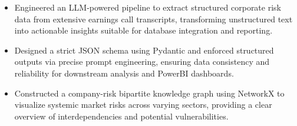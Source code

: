 \documentclass[10pt, letterpaper]{article}
\begin{document}
\begin{itemize}[leftmargin=0.15in, topsep=0pt, partopsep=0pt, itemsep=-2pt]
    \item Engineered an LLM-powered pipeline to extract structured corporate risk data from extensive earnings call transcripts, transforming unstructured text into actionable insights suitable for database integration and reporting.
    \item Designed a strict JSON schema using Pydantic and enforced structured outputs via precise prompt engineering, ensuring data consistency and reliability for downstream analysis and PowerBI dashboards.
    \item Constructed a company-risk bipartite knowledge graph using NetworkX to visualize systemic market risks across varying sectors, providing a clear overview of interdependencies and potential vulnerabilities.
\end{itemize}
\vspace{4pt}


\end{document}
